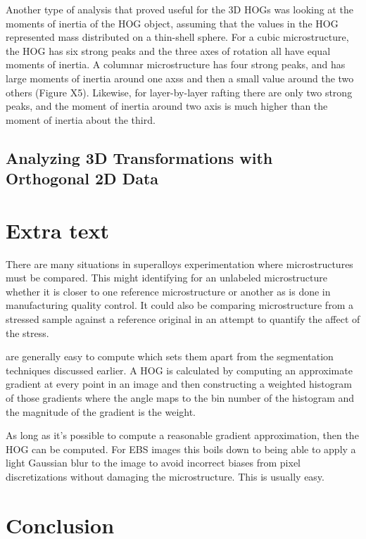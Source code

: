\documentclass[review]{elsarticle}
\begin{document}
	Another type of analysis that proved useful for the 3D HOGs was looking at the moments of inertia of the HOG object, assuming that the values in the HOG represented mass distributed on a thin-shell sphere. For a cubic microstructure, the HOG has six strong peaks and the three axes of rotation all have equal moments of inertia. A columnar microstructure has four strong peaks, and has large moments of inertia around one axss and then a small value around the two others (Figure X5). Likewise, for layer-by-layer rafting there are only two strong peaks, and the moment of inertia around two axis is much higher than the moment of inertia about the third.
	\subsection{Analyzing 3D Transformations with Orthogonal 2D Data}
	\section{Extra text}
	There are many situations in superalloys experimentation where microstructures must be compared. This might identifying for an unlabeled microstructure whether it is closer to one reference microstructure or another as is done in manufacturing quality control. It could also be comparing microstructure from a stressed sample against a reference original in an attempt to quantify the affect of the stress.
	
	 are generally easy to compute which sets them apart from the segmentation techniques discussed earlier. A HOG is calculated by computing an approximate gradient at every point in an image and then constructing a weighted histogram of those gradients where the angle maps to the bin number of the histogram and the magnitude of the gradient is the weight.

	As long as it's possible to compute a reasonable gradient approximation, then the HOG can be computed. For EBS images this boils down to being able to apply a light Gaussian blur to the image to avoid incorrect biases from pixel discretizations without damaging the microstructure. This is usually easy.

	\section{Conclusion}
\end{document}
